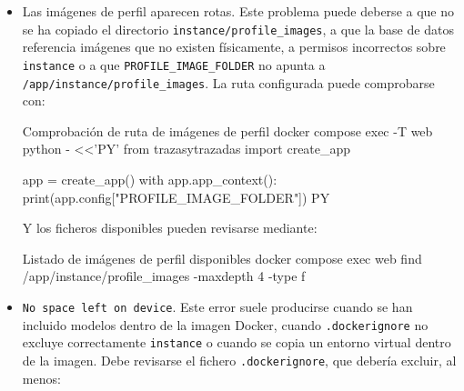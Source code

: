 \begin{itemize}
	\begin{infocmdboxnf}{Rutas esperadas de instancia y modelos}
/app/instance
/app/instance/model
	\end{infocmdboxnf}
	
	También debe comprobarse que los ficheros existen físicamente:
	
	\begin{dockerboxnf}{Comprobación de ficheros de modelos}
docker compose exec web ls -lh /app/instance/model
	\end{dockerboxnf}
	
	Solo se entregan tres modelos, por lo que, debe ajustarse la variable correspondiente:
	
	\begin{infocmdboxnf}{Número de modelos entregados}
SEG_N_FOLDS=3
	\end{infocmdboxnf}
	
	\item Las imágenes de perfil aparecen rotas. Este problema puede deberse a que no se ha copiado el directorio \texttt{instance/profile\_images}, a que la base de datos referencia imágenes que no existen físicamente, a permisos incorrectos sobre \texttt{instance} o a que \texttt{PROFILE\_IMAGE\_FOLDER} no apunta a \texttt{/app/instance/profile\_images}. La ruta configurada puede comprobarse con:
	
	\begin{dockerboxnf}{Comprobación de ruta de imágenes de perfil}
docker compose exec -T web python - <<'PY'
from trazasytrazadas import create_app

app = create_app()
with app.app_context():
print(app.config["PROFILE_IMAGE_FOLDER"])
PY
	\end{dockerboxnf}
	
	Y los ficheros disponibles pueden revisarse mediante:
	
	\begin{dockerboxnf}{Listado de imágenes de perfil disponibles}
docker compose exec web find /app/instance/profile_images -maxdepth 4 -type f
	\end{dockerboxnf}
	
	\item \texttt{No space left on device}. Este error suele producirse cuando se han incluido modelos dentro de la imagen Docker, cuando \texttt{.dockerignore} no excluye correctamente \texttt{instance} o cuando se copia un entorno virtual dentro de la imagen. Debe revisarse el fichero \texttt{.dockerignore}, que debería excluir, al menos:
	

\end{itemize}
